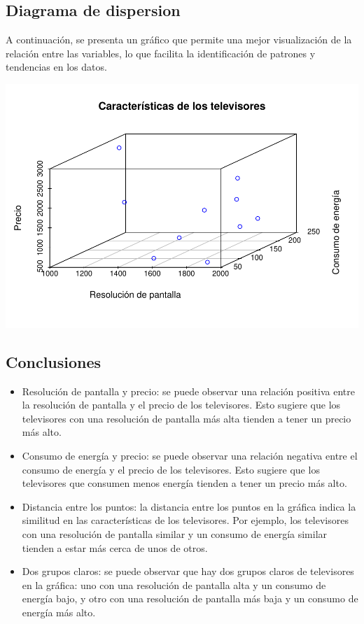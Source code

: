 \documentclass[
]{article}
\begin{document}
\hypertarget{diagrama-de-dispersion}{%
\subsection{Diagrama de dispersion}\label{diagrama-de-dispersion}}

A continuación, se presenta un gráfico que permite una mejor
visualización de la relación entre las variables, lo que facilita la
identificación de patrones y tendencias en los datos.

\includegraphics{AMTV_Docum_Consolidado_files/figure-latex/scatterplot3d-1.pdf}

\hypertarget{conclusiones-2}{%
\subsection{Conclusiones}\label{conclusiones-2}}

\begin{itemize}
\item
  Resolución de pantalla y precio: se puede observar una relación
  positiva entre la resolución de pantalla y el precio de los
  televisores. Esto sugiere que los televisores con una resolución de
  pantalla más alta tienden a tener un precio más alto.
\item
  Consumo de energía y precio: se puede observar una relación negativa
  entre el consumo de energía y el precio de los televisores. Esto
  sugiere que los televisores que consumen menos energía tienden a tener
  un precio más alto.
\item
  Distancia entre los puntos: la distancia entre los puntos en la
  gráfica indica la similitud en las características de los televisores.
  Por ejemplo, los televisores con una resolución de pantalla similar y
  un consumo de energía similar tienden a estar más cerca de unos de
  otros.
\item
  Dos grupos claros: se puede observar que hay dos grupos claros de
  televisores en la gráfica: uno con una resolución de pantalla alta y
  un consumo de energía bajo, y otro con una resolución de pantalla más
  baja y un consumo de energía más alto.
\end{itemize}
\end{document}
